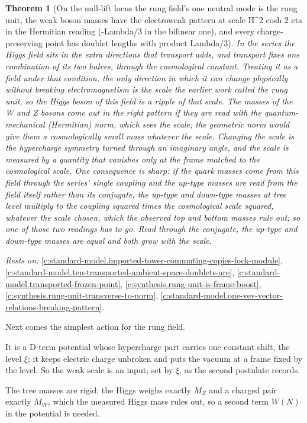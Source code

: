 \documentclass[11pt]{article}
\newtheorem{theorem}{Theorem}[section]
\theoremstyle{definition}
\theoremstyle{plain}
\begin{document}
\begin{theorem}[On the null-lift locus the rung field's one neutral mode is the rung unit, the weak boson masses have the electroweak pattern at scale H\^{}2 cosh 2 eta in the Hermitian reading (-Lambda/3 in the bilinear one), and every charge-preserving point has doublet lengths with product Lambda/3]\label{c:synthesis.rung-field-on-the-lift-locus}
In the series the Higgs field sits in the extra directions that transport adds, and transport fixes one combination of its two halves, through the cosmological constant. Treating it as a field under that condition, the only direction in which it can change physically without breaking electromagnetism is the scale the earlier work called the rung unit, so the Higgs boson of this field is a ripple of that scale. The masses of the W and Z bosons come out in the right pattern if they are read with the quantum-mechanical (Hermitian) norm, which sees the scale; the geometric norm would give them a cosmologically small mass whatever the scale. Changing the scale is the hypercharge symmetry turned through an imaginary angle, and the scale is measured by a quantity that vanishes only at the frame matched to the cosmological scale. One consequence is sharp: if the quark masses come from this field through the series' single coupling and the up-type masses are read from the field itself rather than its conjugate, the up-type and down-type masses at tree level multiply to the coupling squared times the cosmological scale squared, whatever the scale chosen, which the observed top and bottom masses rule out; so one of those two readings has to go. Read through the conjugate, the up-type and down-type masses are equal and both grow with the scale.
\end{theorem}
\noindent\emph{Rests on:} \ref{c:standard-model.imported-tower-commuting-copies-fock-module}, \ref{c:standard-model.ten-transported-ambient-space-doublets-are}, \ref{c:standard-model.transported-frozen-point}, \ref{c:synthesis.rung-unit-is-frame-boost}, \ref{c:synthesis.rung-unit-transverse-to-norm}, \ref{c:standard-model.one-vev-vector-relations-breaking-pattern}.

Next comes the simplest action for the rung field.

It is a D-term potential whose hypercharge part carries one constant shift, the level $\xi$; it keeps electric charge unbroken and puts the vacuum at a frame fixed by the level. So the weak scale is an input, set by $\xi$, as the second postulate records.

The tree masses are rigid: the Higgs weighs exactly $M_{Z}$ and a charged pair exactly $M_{W}$, which the measured Higgs mass rules out, so a second term $W(N)$ in the potential is needed.
\end{document}
